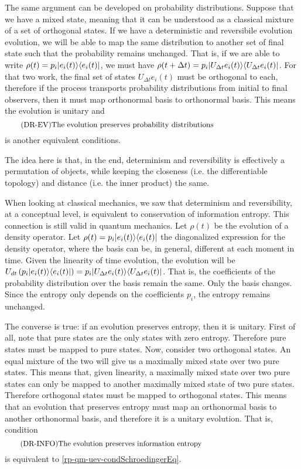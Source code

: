 The same argument can be developed on probability distributions. Suppose that we have a mixed state, meaning that it can be understood as a classical mixture of a set of orthogonal states. If we have a deterministic and reversibile evolution evolution, we will be able to map the same distribution to another set of final state such that the probability remains unchanged. That is, if we are able to write $\rho(t) = p_i |e_i(t) \rangle \langle e_i(t)|$, we must have $\rho(t+ \Delta t) = p_i |U_{\Delta t}e_i(t) \rangle \langle U_{\Delta t} e_i(t)|$. For that two work, the final set of states $U_{\Delta t}e_i(t)$ must be orthogonal to each, therefore if the process transports probability distributions from initial to final observers, then it must map orthonormal basis to orthonormal basis. This means the evolution is unitary and 
\begin{equation}\label{rp-qm-uev-condProbTrans}
	\tag{DR-EV}
	\eqtext{The evolution preserves probability distributions} 
\end{equation}
is another equivalent conditions.

The idea here is that, in the end, determinism and reversibility is effectively a permutation of objects, while keeping the closeness (i.e. the differentiable topology) and distance (i.e. the inner product) the same.


When looking at classical mechanics, we saw that determinism and reversibility, at a conceptual level, is equivalent to conservation of information entropy. This connection is still valid in quantum mechanics. Let $\rho(t)$ be the evolution of a density operator. Let $\rho(t) = p_i |e_i(t) \rangle \langle e_i(t)|$ the diagonalized expression for the density operator, where the basis can be, in general, different at each moment in time. Given the linearity of time evolution, the evolution will be $U_{dt} \left( p_i |e_i(t) \rangle \langle e_i(t)| \right)= p_i |U_{\Delta t}e_i(t) \rangle \langle U_{\Delta t} e_i(t)|$. That is, the coefficients of the probability distribution over the basis remain the same. Only the basis changes. Since the entropy only depends on the coefficients $p_i$, the entropy remains unchanged.

The converse is true: if an evolution preserves entropy, then it is unitary. First of all, note that pure states are the only states with zero entropy. Therefore pure states must be mapped to pure states. Now, consider two orthogonal states. An equal mixture of the two will give us a maximally mixed state over two pure states. This means that, given linearity, a maximally mixed state over two pure states can only be mapped to another maximally mixed state of two pure states. Therefore orthogonal states must be mapped to orthogonal states. This means that an evolution that preserves entropy must map an orthonormal basis to another orthonormal basis, and therefore it is a unitary evolution. That is, condition
\begin{equation}\label{rp-qm-uev-condInfoEntropy}
	\tag{DR-INFO}
	\eqtext{The evolution preserves information entropy} 
\end{equation}
is equivalent to \ref{rp-qm-uev-condSchroedingerEq}.

